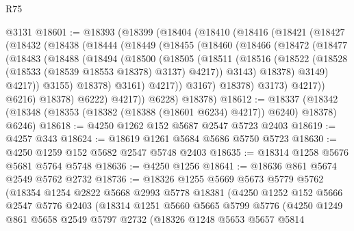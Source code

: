 \begin{lexlean}{R75}
\begin{coremodule}
    @3131
@18601 := @18393
    (@18399
      (@18404
        (@18410
          (@18416
            (@18421
              (@18427
                (@18432
                  (@18438
                    (@18444
                      (@18449
                        (@18455
                          (@18460
                            (@18466
                              (@18472
                                (@18477
                                  (@18483
                                    (@18488
                                      (@18494
                                        (@18500
                                          (@18505
                                            (@18511
                                              (@18516
                                                (@18522
                                                  (@18528
                                                    (@18533 (@18539 @18553 @18378) @3137)
                                                    @4217))
                                                @3143)
                                              @18378)
                                            @3149)
                                          @4217))
                                      @3155)
                                    @18378)
                                  @3161)
                                @4217))
                            @3167)
                          @18378)
                        @3173)
                      @4217))
                  @6216)
                @18378)
              @6222)
            @4217))
        @6228)
      @18378)
@18612 := @18337
    (@18342 (@18348 (@18353 (@18382 (@18388 (@18601 @6234) @4217)) @6240) @18378) @6246)
@18618 := @4250 @1262 @152 @5687 @2547 @5723 @2403
@18619 := @4257 @343
@18624 := @18619 @1261 @5684 @5686 @5750 @5723
@18630 := @4250 @1259 @152 @5682 @2547 @5748 @2403
@18635 := @18314 @1258 @5676 @5681 @5764 @5748
@18636 := @4250 @1256
@18641 := @18636 @861 @5674 @2549 @5762 @2732
@18736 := @18326
    @1255
    @5669
    @5673
    @5779
    @5762
    (@18354
      @1254
      @2822
      @5668
      @2993
      @5778
      @18381
      (@4250
        @1252
        @152
        @5666
        @2547
        @5776
        @2403
        (@18314
          @1251
          @5660
          @5665
          @5799
          @5776
          (@4250
            @1249
            @861
            @5658
            @2549
            @5797
            @2732
            (@18326
              @1248
              @5653
              @5657
              @5814

\end{coremodule}
\end{lexlean}
